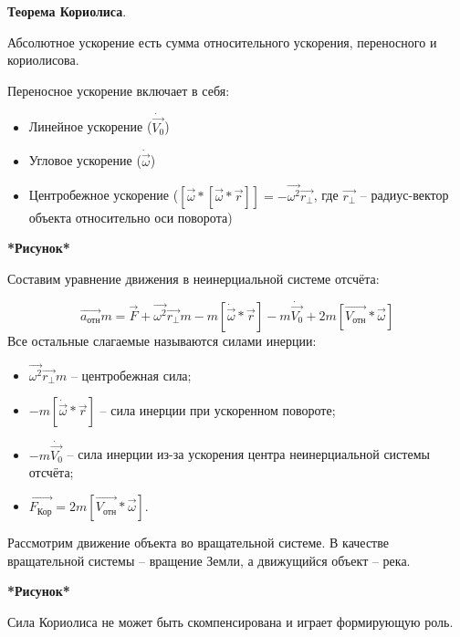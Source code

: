 \documentclass[a4paper,oneside]{article}
\theoremstyle{definition}
\theoremstyle{definition}
\theoremstyle{definition}
\newcommand{\tbf}[1]{\textbf{#1}}
\begin{document}
\tbf{Теорема Кориолиса}. 

Абсолютное ускорение есть сумма относительного ускорения, переносного и кориолисова.

Переносное ускорение включает в себя:
\begin{itemize}
    \item Линейное ускорение ($\dot{\vec{V_0}}$)
    \item Угловое ускорение ($\dot{\vec{\omega}}$)
    \item Центробежное ускорение ($[\vec{\omega} * [\vec{\omega} * \vec{r}]] = -\vec{\omega^2} \vec{r_\perp}$,
     где $\vec{r_\perp}$ -- радиус-вектор объекта относительно оси поворота)
\end{itemize}

\tbf{*Рисунок*}

Составим уравнение движения в неинерциальной системе отсчёта:

\[ \vec{a_\text{отн}}m = \vec{F} + \vec{\omega^2} \vec{r_\perp}m - m[\dot{\vec{\omega}} * \vec{r}] - m\dot{\vec{V_0}} + 2m[\vec{V_\text{отн}} * \vec{\omega}] \]
Все остальные слагаемые называются силами инерции:
\begin{itemize}
    \item $\vec{\omega^2} \vec{r_\perp}m$ -- центробежная сила;
    \item $ -m[\dot{\vec{\omega}} * \vec{r}]$ -- сила инерции при ускоренном повороте;
    \item $ -m\dot{\vec{V_0}}$ -- сила инерции из-за ускорения центра неинерциальной системы отсчёта;
    \item $ \vec{F_\text{Кор}} = 2m[\vec{V_\text{отн}} * \vec{\omega}]$.
\end{itemize}

Рассмотрим движение объекта во вращательной системе. В качестве вращательной системы --
вращение Земли, а движущийся объект -- река. 

\tbf{*Рисунок*}

Сила Кориолиса не может быть скомпенсирована и играет формирующую роль.
\end{document}
